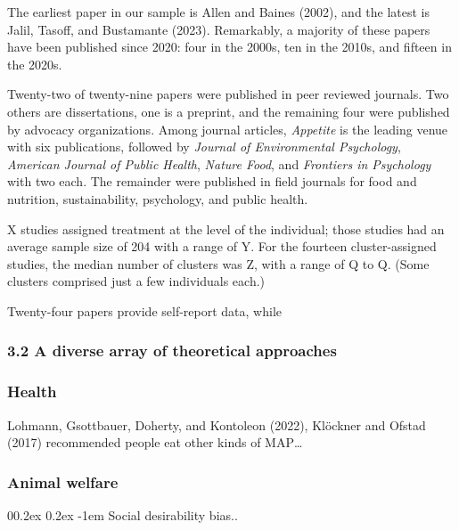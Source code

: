 \documentclass[
  man]{apa6}
\makeatletter
\let\oldparagraph\paragraph
\renewcommand{\paragraph}[1]{\oldparagraph{#1}\mbox{}}
\renewcommand{\paragraph}{\@startsection{paragraph}{4}{\parindent}%
  {0\baselineskip \@plus 0.2ex \@minus 0.2ex}%
  {-1em}%
  {\normalfont\normalsize\bfseries\itshape\typesectitle}}
\makeatother
\begin{document}
The earliest paper in our sample is Allen and Baines (2002), and the latest is Jalil, Tasoff, and Bustamante (2023). Remarkably, a majority of these papers have been published since 2020: four in the 2000s, ten in the 2010s, and fifteen in the 2020s.

Twenty-two of twenty-nine papers were published in peer reviewed journals. Two others are dissertations, one is a preprint, and the remaining four were published by advocacy organizations. Among journal articles, \emph{Appetite} is the leading venue with six publications, followed by \emph{Journal of Environmental Psychology}, \emph{American Journal of Public Health}, \emph{Nature Food}, and \emph{Frontiers in Psychology} with two each. The remainder were published in field journals for food and nutrition, sustainability, psychology, and public health.

X studies assigned treatment at the level of the individual; those studies had an average sample size of 204 with a range of Y. For the fourteen cluster-assigned studies, the median number of clusters was Z, with a range of Q to Q. (Some clusters comprised just a few individuals each.)

Twenty-four papers provide self-report data, while

\subsubsection{3.2 A diverse array of theoretical approaches}\label{a-diverse-array-of-theoretical-approaches}

\subsubsection{Health}\label{health}

Lohmann, Gsottbauer, Doherty, and Kontoleon (2022), Klöckner and Ofstad (2017) recommended people eat other kinds of MAP\ldots{}

\subsubsection{Animal welfare}\label{animal-welfare}

\paragraph{Social desirability bias..}\label{social-desirability-bias..}
\end{document}

